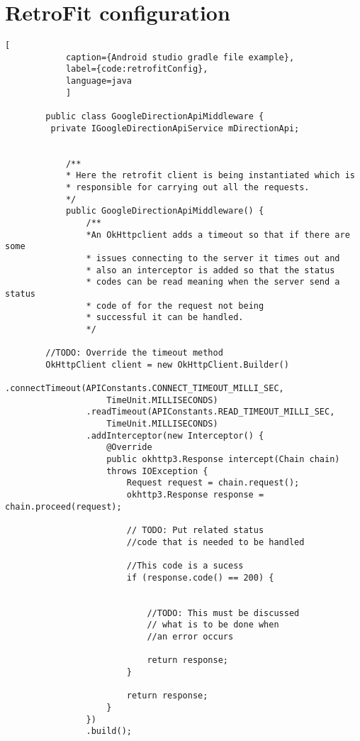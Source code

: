 \newpage
        \section{RetroFit configuration}
        \begin{lstlisting}[
            caption={Android studio gradle file example},
            label={code:retrofitConfig},
            language=java
            ]

        public class GoogleDirectionApiMiddleware {
         private IGoogleDirectionApiService mDirectionApi;


            /**
            * Here the retrofit client is being instantiated which is
            * responsible for carrying out all the requests.
            */
            public GoogleDirectionApiMiddleware() {
                /**
                *An OkHttpclient adds a timeout so that if there are some 
                * issues connecting to the server it times out and
                * also an interceptor is added so that the status 
                * codes can be read meaning when the server send a status 
                * code of for the request not being
                * successful it can be handled.
                */

        //TODO: Override the timeout method
        OkHttpClient client = new OkHttpClient.Builder()
                .connectTimeout(APIConstants.CONNECT_TIMEOUT_MILLI_SEC, 
                    TimeUnit.MILLISECONDS)
                .readTimeout(APIConstants.READ_TIMEOUT_MILLI_SEC, 
                    TimeUnit.MILLISECONDS)
                .addInterceptor(new Interceptor() {
                    @Override
                    public okhttp3.Response intercept(Chain chain) 
                    throws IOException {
                        Request request = chain.request();
                        okhttp3.Response response = chain.proceed(request);

                        // TODO: Put related status 
                        //code that is needed to be handled

                        //This code is a sucess
                        if (response.code() == 200) {


                            //TODO: This must be discussed
                            // what is to be done when 
                            //an error occurs

                            return response;
                        }

                        return response;
                    }
                })
                .build();


\end{lstlisting}
